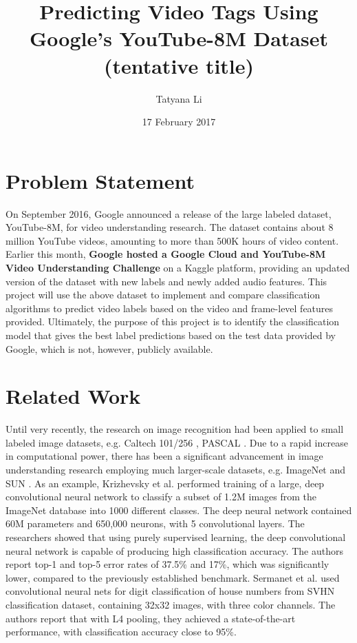 \documentclass{sig-alternate-05-2015}
\begin{document}

\title{Predicting Video Tags Using Google's YouTube-8M Dataset (tentative title)}

\author{
Tatyana Li \\
}
\date{17 February 2017}

\maketitle

\section{Problem Statement}
On September 2016, Google announced a release of the large labeled dataset, YouTube-8M, for video understanding research. The dataset contains about 8 million YouTube videos, amounting to more than 500K hours of video content. Earlier this month, \textbf{Google hosted a Google Cloud and YouTube-8M Video Understanding Challenge} on a Kaggle platform, providing an updated version of the dataset with new labels and newly added audio features. 
This project will use the above dataset to implement and compare classification algorithms to predict video labels based on the video and frame-level features provided. Ultimately, the purpose of this project is to identify the classification model that gives the best label predictions based on the test data provided by Google, which is not, however, publicly available.

\section{Related Work}
Until very recently, the research on image recognition had been applied to small labeled image datasets, e.g. Caltech 101/256 \cite{1}, PASCAL \cite{2}. Due to a rapid increase in computational power, there has been a significant advancement in image understanding research employing much larger-scale datasets, e.g. ImageNet \cite{3} and SUN \cite{4}. As an example, Krizhevsky et al. \cite{5} performed training of a large, deep convolutional neural network to classify a subset of 1.2M images from the ImageNet database into 1000 different classes. The deep neural network contained 60M parameters and 650,000 neurons, with 5 convolutional layers. The researchers showed that using purely supervised learning, the deep convolutional neural network is capable of producing high classification accuracy. The authors report top-1 and top-5 error rates of 37.5\% and 17\%, which was significantly lower, compared to the previously established benchmark. Sermanet et al. \cite{6} used convolutional neural nets for digit classification of house numbers from SVHN classification dataset, containing 32x32 images, with three color channels. The authors report that with L4 pooling, they achieved a state-of-the-art performance, with classification accuracy close to 95\%. 
\end{document}
